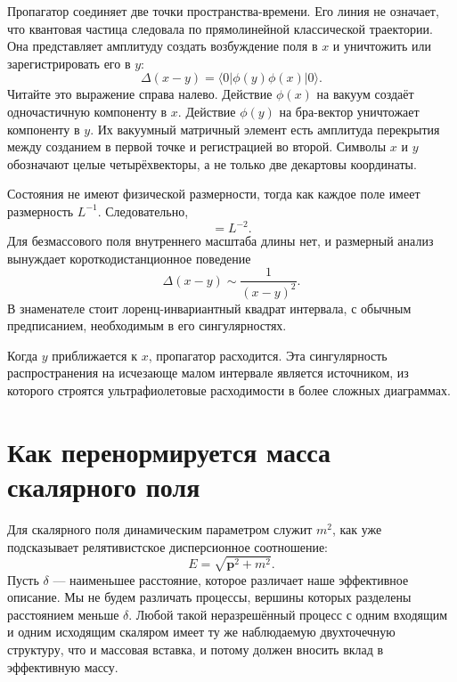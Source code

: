 Пропагатор соединяет две точки пространства-времени. Его линия не означает, что квантовая частица следовала по прямолинейной классической траектории. Она представляет амплитуду создать возбуждение поля в \(x\) и уничтожить или зарегистрировать его в \(y\):
\begin{equation}
\Delta(x-y)=\langle0|\phi(y)\phi(x)|0\rangle.
\label{eq:position-propagator}
\end{equation}
Читайте это выражение справа налево. Действие \(\phi(x)\) на вакуум создаёт одночастичную компоненту в \(x\). Действие \(\phi(y)\) на бра-вектор уничтожает компоненту в \(y\). Их вакуумный матричный элемент есть амплитуда перекрытия между созданием в первой точке и регистрацией во второй. Символы \(x\) и \(y\) обозначают целые четырёхвекторы, а не только две декартовы координаты.

Состояния не имеют физической размерности, тогда как каждое поле имеет размерность \(L^{-1}\). Следовательно,
\begin{equation}
[\Delta]=L^{-2}.
\end{equation}
Для безмассового поля внутреннего масштаба длины нет, и размерный анализ вынуждает короткодистанционное поведение
\begin{equation}
\Delta(x-y)\sim\frac{1}{(x-y)^2}.
\label{eq:massless-propagator}
\end{equation}
В знаменателе стоит лоренц-инвариантный квадрат интервала, с обычным предписанием, необходимым в его сингулярностях.

Когда \(y\) приближается к \(x\), пропагатор расходится. Эта сингулярность распространения на исчезающе малом интервале является источником, из которого строятся ультрафиолетовые расходимости в более сложных диаграммах.

\section{Как перенормируется масса скалярного поля}

Для скалярного поля динамическим параметром служит \(m^2\), как уже подсказывает релятивистское дисперсионное соотношение:
\begin{equation}
E=\sqrt{\mathbf p^2+m^2}.
\end{equation}
Пусть \(\delta\) — наименьшее расстояние, которое различает наше эффективное описание. Мы не будем различать процессы, вершины которых разделены расстоянием меньше \(\delta\). Любой такой неразрешённый процесс с одним входящим и одним исходящим скаляром имеет ту же наблюдаемую двухточечную структуру, что и массовая вставка, и потому должен вносить вклад в эффективную массу.

